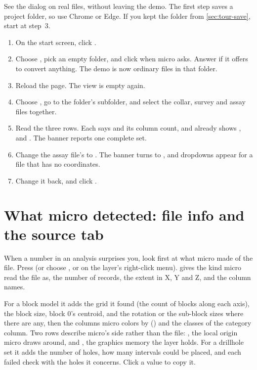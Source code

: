 \begin{tryit}
See the dialog on real files, without leaving the demo. The first step saves a project folder, so use Chrome or Edge. If you kept the  folder from \cref{sec:tour-save}, start at step~3.
\begin{enumerate}
\item On the start screen, click .
\item Choose , pick an empty folder, and click  when micro asks. Answer  if it offers to convert anything. The demo is now ordinary files in that folder.
\item Reload the page. The view is empty again.
\item Choose , go to the folder's  subfolder, and select the collar, survey and assay files together.
\item Read the three rows. Each says  and its column count, and  already shows ,  and . The banner reports one complete set.
\item Change the assay file's  to . The banner turns to , and    dropdowns appear for a file that has no coordinates.
\item Change it back, and click .
\end{enumerate}
\end{tryit}

\section{What micro detected: file info and the source tab}\label{sec:opening-fileinfo}

When a number in an analysis surprises you, look first at what micro made of the file. Press  (or choose , or  on the layer's right-click menu).  gives the kind micro read the file as, the number of records, the extent in X, Y and Z, and the column names.

For a block model it adds the grid it found (the count of blocks along each axis), the block size, block 0's centroid, and the rotation or the sub-block sizes where there are any, then the columns micro colors by () and the classes of the category column. Two rows describe micro's side rather than the file: , the local origin micro draws around, and , the graphics memory the layer holds. For a drillhole set it adds the number of holes, how many intervals could be placed, and each failed check with the holes it concerns. Click a value to copy it.

